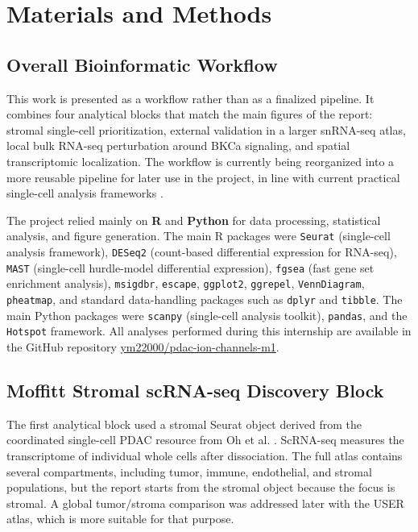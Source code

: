\documentclass[11pt,a4paper]{article}
\begin{document}
\section{Materials and Methods}

\subsection{Overall Bioinformatic Workflow}
This work is presented as a workflow rather than as a finalized pipeline. It combines four analytical blocks that match the main figures of the report: stromal single-cell prioritization, external validation in a larger snRNA-seq atlas, local bulk RNA-seq perturbation around BKCa signaling, and spatial transcriptomic localization. The workflow is currently being reorganized into a more reusable pipeline for later use in the project, in line with current practical single-cell analysis frameworks \citep{luecken2019,he2022}.

The project relied mainly on \textbf{R} and \textbf{Python} for data processing, statistical analysis, and figure generation. The main R packages were \texttt{Seurat} (single-cell analysis framework), \texttt{DESeq2} (count-based differential expression for RNA-seq), \texttt{MAST} (single-cell hurdle-model differential expression), \texttt{fgsea} (fast gene set enrichment analysis), \texttt{msigdbr}, \texttt{escape}, \texttt{ggplot2}, \texttt{ggrepel}, \texttt{VennDiagram}, \texttt{pheatmap}, and standard data-handling packages such as \texttt{dplyr} and \texttt{tibble}. The main Python packages were \texttt{scanpy} (single-cell analysis toolkit), \texttt{pandas}, and the \texttt{Hotspot} framework. All analyses performed during this internship are available in the GitHub repository \href{https://github.com/ym22000/pdac-ion-channels-m1}{ym22000/pdac-ion-channels-m1}.

\subsection{Moffitt Stromal scRNA-seq Discovery Block}
The first analytical block used a stromal Seurat object derived from the coordinated single-cell PDAC resource from Oh et al. \citep{oh2023}. ScRNA-seq measures the transcriptome of individual whole cells after dissociation. The full atlas contains several compartments, including tumor, immune, endothelial, and stromal populations, but the report starts from the stromal object because the focus is stromal. A global tumor/stroma comparison was addressed later with the USER atlas, which is more suitable for that purpose.
\end{document}
